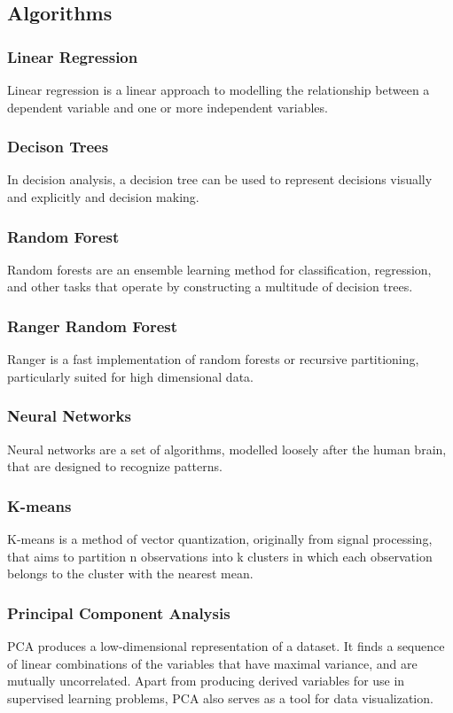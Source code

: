 \documentclass{FR16}
\begin{document}
\subsection{Algorithms}
\subsubsection{Linear Regression}
 Linear regression  is a linear approach to modelling the relationship between a dependent variable and one or more independent variables. 
 
  \subsubsection{Decison Trees}
In decision analysis, a decision tree can be used to represent decisions visually and explicitly and decision making.


 \subsubsection{Random Forest}
 Random forests are an ensemble learning method for classification, regression, and other tasks that operate by constructing a multitude of decision trees.
 \subsubsection{Ranger Random Forest}
Ranger is a fast implementation of random forests or recursive partitioning, particularly suited for high dimensional data. 

\subsubsection{Neural Networks}
Neural networks are a set of algorithms, modelled  loosely after the human brain, that are designed to recognize patterns.

\subsubsection{K-means}
K-means is a method of vector quantization, originally from signal processing, that aims to partition n observations into k clusters in which each observation belongs to the cluster with the nearest mean.

\subsubsection{Principal Component Analysis}
PCA produces a low-dimensional representation of a
dataset. It finds a sequence of linear combinations of the
variables that have maximal variance, and are mutually
uncorrelated. Apart from producing derived variables for use in
supervised learning problems, PCA also serves as a tool for
data visualization.
\end{document}

